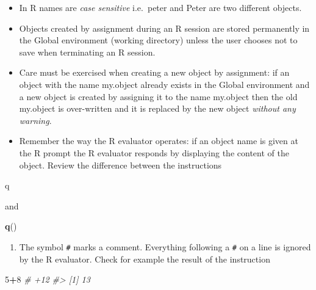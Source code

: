 \documentclass[
]{book}
\newenvironment{Shaded}{\begin{snugshade}}{\end{snugshade}}
\newcommand{\CommentTok}[1]{\textcolor[rgb]{0.56,0.35,0.01}{\textit{#1}}}
\newcommand{\DecValTok}[1]{\textcolor[rgb]{0.00,0.00,0.81}{#1}}
\newcommand{\FunctionTok}[1]{\textcolor[rgb]{0.13,0.29,0.53}{\textbf{#1}}}
\newcommand{\NormalTok}[1]{#1}
\newcommand{\SpecialCharTok}[1]{\textcolor[rgb]{0.81,0.36,0.00}{\textbf{#1}}}
\providecommand{\tightlist}{%
  \setlength{\itemsep}{0pt}\setlength{\parskip}{0pt}}
\begin{document}
\begin{itemize}
\tightlist
\item
  In R names are \emph{{case sensitive}} i.e.~peter and Peter are two different objects.
\item
  Objects created by assignment during an R session are stored permanently in the Global environment (working directory) unless the user chooses not to save when terminating an R session.
\item
  Care must be exercised when creating a new object by assignment: if an object with the name my.object already exists in the Global environment and a new object is created by assigning it to the name my.object then the old my.object is over-written and it is replaced by the new object \emph{{without any warning}}.
\item
  Remember the way the R evaluator operates: if an object name is given at the R prompt the R evaluator responds by displaying the content of the object. Review the difference between the instructions
\end{itemize}

\begin{Shaded}
\begin{Highlighting}[]
\NormalTok{q}
\end{Highlighting}
\end{Shaded}

and

\begin{Shaded}
\begin{Highlighting}[]
\FunctionTok{q}\NormalTok{()}
\end{Highlighting}
\end{Shaded}

\begin{enumerate}
\def\labelenumi{(\alph{enumi})}
\setcounter{enumi}{4}
\tightlist
\item
  The symbol \texttt{\#} marks a comment. Everything following a \texttt{\#} on a line is ignored by the R evaluator. Check for example the result of the instruction
\end{enumerate}

\begin{Shaded}
\begin{Highlighting}[]
\DecValTok{5}\SpecialCharTok{+}\DecValTok{8} \CommentTok{\# +12}
\CommentTok{\#\textgreater{} [1] 13}
\end{Highlighting}
\end{Shaded}
\end{document}
